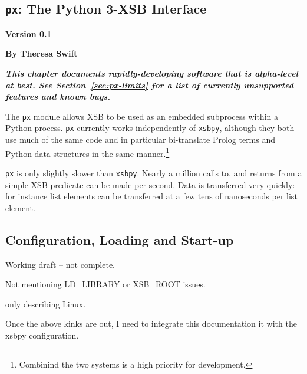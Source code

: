 
\newcommand{\pxversion}{Version 0.1}
\newcommand{\px}{{\tt px}}

\begin{center}
\chapter{\px{}: The Python 3-XSB Interface} \label{chap:px}
\end{center}

\vspace*{-.30in} 
\begin{center}
{\Large {\bf  \pxversion}}
\end{center}

\begin{center}
  {\Large {\bf By Theresa Swift}}
\end{center}

\noindent
{\large {\bf {\em This chapter documents rapidly-developing software
      that is alpha-level at best.  See Section~\ref{sec:px-limits}
      for a list of currently unsupported features and known bugs.}}}

The \px{} module allows XSB to be used as an embedded subprocess
within a Python process.  \px{} currently works independently of
{\tt xsbpy}, although they both use much of the same code and in
particular bi-translate Prolog terms and Python data structures in the
same manner.\footnote{Combinind the two systems is a high priority
  for development.}

\px{} is only slightly slower than {\tt xsbpy}.  Nearly a million
calls to, and returns from a simple XSB predicate can be made per
second.  Data is transferred very quickly: for instance list elements
can be transferred at a few tens of nanoseconds per list element.

\section{Configuration, Loading and Start-up} \label{px:config}

{\sc Working draft -- not complete.
  \bi
  \item Not mentioning LD\_LIBRARY or XSB\_ROOT issues.
  \item  only describing Linux.
  \item Once the above kinks are out, I need to integrate this
    documentation it with the xsbpy configuration.
    \ei
    }


